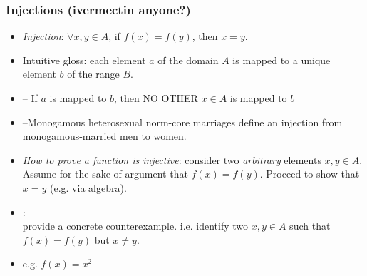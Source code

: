 \begin{frame}
\frametitle{Injections (ivermectin anyone?)}

\begin{itemize}[<+->]

\item \emph{Injection}: $\forall x, y \in A$, if $f(x) = f(y)$, then $x = y$.
\item[] Intuitive gloss: each element $a$ of the domain $A$ is mapped to a unique element $b$ of the range $B$. 
\item[] -- If $a$ is mapped to $b$, then NO OTHER $x \in A$ is mapped to $b$
\item[] --Monogamous heterosexual norm-core marriages define an injection from monogamous-married men to women. 

\item  \emph{How to prove a function is injective}: consider two \textit{arbitrary} elements $x, y \in A$. Assume for the sake of argument that $f(x) = f(y)$. Proceed to show that $x=y$ (e.g. via algebra).

\item {}: \\ provide a concrete counterexample. i.e. identify two $x, y \in A$ such that $f(x) = f(y)$ but $x \neq y$.
\item[] e.g. $f(x) = x^2$

\end{itemize}
\end{frame}

